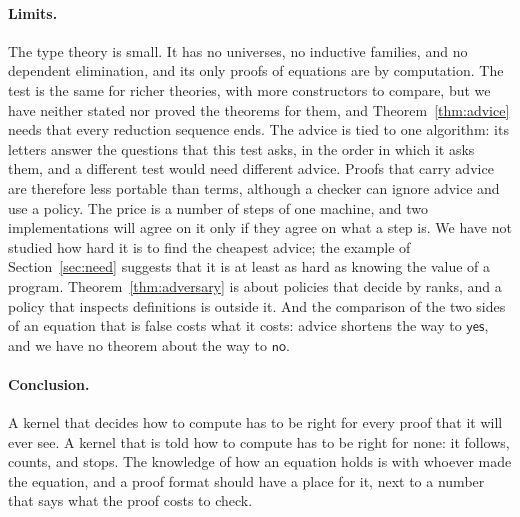\documentclass[acmsmall,nonacm,screen]{acmart}
\newcommand{\kw}[1]{\mathsf{#1}}
\newcommand{\yes}{\kw{yes}}
\newcommand{\no}{\kw{no}}
\begin{document}
\paragraph{Limits.} The type theory is small. It has no universes, no inductive families,
and no dependent elimination, and its only proofs of equations are by computation. The test
is the same for richer theories, with more constructors to compare, but we have neither
stated nor proved the theorems for them, and Theorem~\ref{thm:advice} needs that every
reduction sequence ends. The advice is tied to one algorithm: its letters answer the
questions that this test asks, in the order in which it asks them, and a different test
would need different advice. Proofs that carry advice are therefore less portable than
terms, although a checker can ignore advice and use a policy. The price is a number of steps
of one machine, and two implementations will agree on it only if they agree on what a step
is. We have not studied how hard it is to find the cheapest advice; the example of
Section~\ref{sec:need} suggests that it is at least as hard as knowing the value of a
program. Theorem~\ref{thm:adversary} is about policies that decide by ranks, and a policy
that inspects definitions is outside it. And the comparison of the two sides of an equation
that is false costs what it costs: advice shortens the way to $\yes$, and we have no theorem
about the way to $\no$.

\paragraph{Conclusion.} A kernel that decides how to compute has to be right for every proof
that it will ever see. A kernel that is told how to compute has to be right for none: it
follows, counts, and stops. The knowledge of how an equation holds is with whoever made the
equation, and a proof format should have a place for it, next to a number that says what the
proof costs to check.



\end{document}
